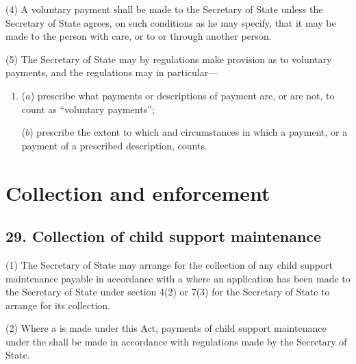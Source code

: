 \documentclass[a4paper]{article}
\begin{document}
{(4)
A voluntary payment shall be made to the Secretary of State unless the Secretary of State agrees, on such conditions as he may specify, that it may be made to the person with care, or to or through another person.

(5)
The Secretary of State may by regulations make provision as to voluntary payments, and the regulations may in particular---
\begin{enumerate}\item[]
($a$) prescribe what payments or descriptions of payment are, or are not, to count as “voluntary payments”;

($b$) prescribe the extent to which and circumstances in which a payment, or a payment of a prescribed description, counts.
\end{enumerate}

}

\section{Collection and enforcement}

\subsection{29. Collection of child support maintenance}

(1) The Secretary of State may arrange for the collection of any child support maintenance payable in accordance with a  where
an application has been made to the Secretary of State under section 4(2)
or 7(3) for the Secretary of State to arrange for its collection.

(2) Where a  is made under this Act, payments of child support maintenance under the  shall be made in accordance with regulations made by the Secretary of State.
\end{document}
